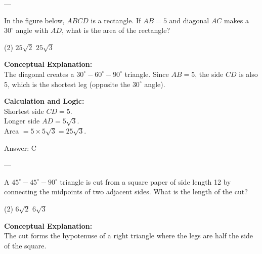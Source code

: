 \documentclass[11pt,paper=a4,answers]{exam}
\begin{document}
\begin{questions}
---

\question
In the figure below, $ABCD$ is a rectangle. If $AB = 5$ and diagonal $AC$ makes a $30^\circ$ angle with $AD$, what is the area of the rectangle?
\begin{center}
\end{center}
\begin{tasks}(2)
    \task $25\sqrt{2}$
    \task $25\sqrt{3}$
\end{tasks}

\begin{solution}
\textbf{Conceptual Explanation:} \\
The diagonal creates a $30^\circ-60^\circ-90^\circ$ triangle. Since $AB=5$, the side $CD$ is also 5, which is the shortest leg (opposite the $30^\circ$ angle).

\vspace{10pt}
\textbf{Calculation and Logic:} \\
Shortest side $CD = 5$. \\
Longer side $AD = 5\sqrt{3}$. \\
Area $= 5 \times 5\sqrt{3} = 25\sqrt{3}$.

\vspace{15pt}
Answer: \colorbox{yellow!100}{C}
\end{solution}

---

\question
A $45^\circ-45^\circ-90^\circ$ triangle is cut from a square paper of side length 12 by connecting the midpoints of two adjacent sides. What is the length of the cut?
\begin{tasks}(2)
    \task $6\sqrt{2}$
    \task $6\sqrt{3}$
\end{tasks}

\begin{solution}
\textbf{Conceptual Explanation:} \\
The cut forms the hypotenuse of a right triangle where the legs are half the side of the square.


\end{solution}
\end{questions}
\end{document}
